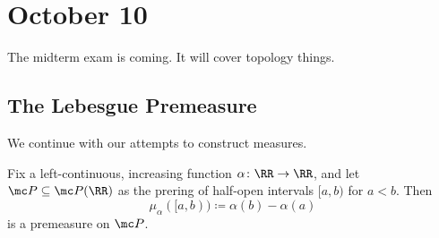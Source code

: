 \documentclass[../notes.tex]{subfiles}
\begin{document}
\section{October 10}

The midterm exam is coming. It will cover topology things.

\subsection{The Lebesgue Premeasure}
We continue with our attempts to construct measures.
\begin{prop}
	Fix a left-continuous, increasing function $\alpha\colon\RR\to\RR$, and let $\mc P\subseteq\mc P(\RR)$ as the prering of half-open intervals $[a,b)$ for $a<b$. Then
	\[\mu_\alpha([a,b))\coloneqq\alpha(b)-\alpha(a)\]
	is a premeasure on $\mc P$.
\end{prop}
\end{document}
